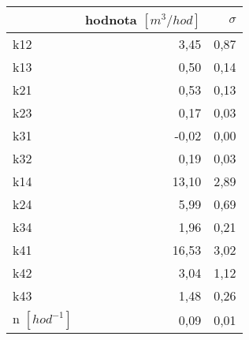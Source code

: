 \begin{tabular}{lrr}
\toprule
{} &  hodnota $\left[\si{m^3/hod}\right]$ &  $\sigma$ \\
\midrule
k12 &    3,45 &  0,87 \\
k13 &    0,50 &  0,14 \\
k21 &    0,53 &  0,13 \\
k23 &    0,17 &  0,03 \\
k31 &   -0,02 &  0,00 \\
k32 &    0,19 &  0,03 \\
k14 &   13,10 &  2,89 \\
k24 &    5,99 &  0,69 \\
k34 &    1,96 &  0,21 \\
k41 &   16,53 &  3,02 \\
k42 &    3,04 &  1,12 \\
k43 &    1,48 &  0,26 \\
n $[\si{hod^{-1}}]$ &                                 0,09 &      0,01 \\
\bottomrule
\end{tabular}
